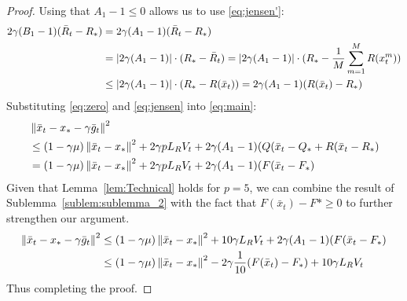 \begin{proof}
    Using that $A_1 - 1 \leq 0$ allows us to use \eqref{eq:jensen'}:
    \begin{align}
        2\gamma (B_1 - 1)(\bar{R}_t - R_*) &= 2\gamma (A_1 - 1)(\bar{R}_t - R_*) \\
        &= |2\gamma (A_1 - 1)| \cdot (R_* - \bar{R}_t) = |2\gamma (A_1 - 1)| \cdot (R_* - \fsumm{m=1}{M}{R(x^m_t})) \\
        &\leq |2\gamma (A_1 - 1)| \cdot (R_* - R(\bar{x}_t)) = 2\gamma (A_1 - 1) (R(\bar{x}_t) - R_*) \label{eq:jensen}
    \end{align}
    Substituting \eqref{eq:zero} and \eqref{eq:jensen} into \eqref{eq:main}:
    \begin{align}
        &\norm{\bar{x}_t - x_* - \gamma \bar{g}_t}^2 \\
        &\leq (1 - \gamma \mu)\norm{\bar{x}_t - x_*}^2 + 2 \gamma p L_R V_t
        + 2\gamma (A_1 - 1)(Q(\bar{x}_t - Q_* + R(\bar{x}_t - R_*) \\
        &= (1 - \gamma \mu)\norm{\bar{x}_t - x_*}^2 + 2 \gamma p L_R V_t
        + 2\gamma (A_1 - 1)(F(\bar{x}_t - F_*)
    \end{align}
    Given that Lemma~\ref{lem:Technical} holds for $p = 5$, we can combine the result of Sublemma~\ref{sublem:sublemma_2} with the fact that $F(\bar{x}_t) - F*\geq 0$ to further strengthen our argument.
    \begin{align}
        \norm{\bar{x}_t - x_* - \gamma \bar{g}_t}^2 &
        \leq (1 - \gamma \mu)\norm{\bar{x}_t - x_*}^2 + 10 \gamma L_R V_t
        + 2\gamma (A_1 - 1)(F(\bar{x}_t - F_*) \\
        &\leq (1 - \gamma \mu)\norm{\bar{x}_t - x_*}^2 - 2\gamma \frac{1}{10}(F(\bar{x}_t) - F_*) + 10 \gamma L_R V_t
    \end{align}
    Thus completing the proof.
\end{proof}

